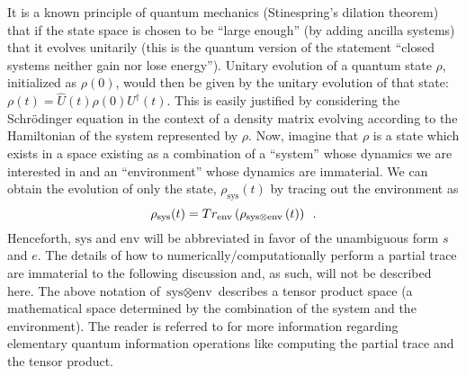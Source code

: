\documentclass{article}
\begin{document}
It is a known principle of quantum mechanics (Stinespring's dilation theorem)
that if the state space is chosen to be ``large enough'' (by adding ancilla
systems) that it evolves unitarily (this is the quantum version of the statement
``closed systems neither gain nor lose energy'').  Unitary evolution of a
quantum state $ \rho $, initialized as $ \rho(0) $, would then be given by the
unitary evolution of that state: $ \rho(t) = \hat{U}(t) \rho(0) U^{\dagger}(t)
$. This is easily justified by considering the Schr\"{o}dinger equation in the
context of a density matrix evolving according to the Hamiltonian of the system
represented by $ \rho $. Now, imagine that $ \rho $ is a state which exists in a
space existing as a combination of a ``system'' whose dynamics we are interested
in and an ``environment'' whose dynamics are immaterial. We can obtain the
evolution of only the state, $ \rho_{\textrm{sys}}(t) $ by tracing out the
environment as
\begin{equation}
   \rho_{\textrm{sys}}(t) = Tr_{\textrm{env}}\left(\rho_{\textrm{sys} \otimes
   \textrm{env}}\left(t\right)\right) \enskip.
\end{equation}
Henceforth, $ \textrm{sys} $ and $ \textrm{env} $ will be abbreviated in favor
of the unambiguous form $ s $ and $ e $. The details of how to
numerically/computationally perform a partial trace are immaterial to the
following discussion and, as such, will not be described here.  The above
notation of $ \textrm{sys} \otimes \textrm{env} $ describes a tensor product
space (a mathematical space determined by the combination of the system and the
environment). The reader is referred to \cite{Nielsen2011} for more information
regarding elementary quantum information operations like computing the partial
trace and the tensor product.
\end{document}
